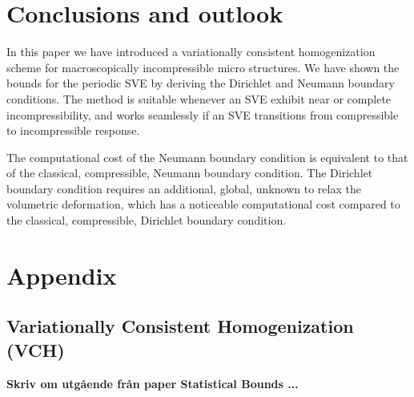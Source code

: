\documentclass[12pt,a4paper]{article}
\begin{document}


\section{Conclusions and outlook}
In this paper we have introduced a variationally consistent homogenization scheme for macroscopically incompressible micro structures.
We have shown the bounds for the periodic SVE by deriving the Dirichlet and Neumann boundary conditions.
The method is suitable whenever an SVE exhibit near or complete incompressibility, and works seamlessly if an SVE transitions from compressible to incompressible response.

The computational cost of the Neumann boundary condition is equivalent to that of the classical, compressible, Neumann boundary condition.
The Dirichlet boundary condition requires an additional, global, unknown to relax the volumetric deformation, which has a noticeable computational cost compared to the classical, compressible, Dirichlet boundary condition.




%
%
%

%

\appendix
\setcounter{equation}{0}
\renewcommand{\theequation}{A-\arabic{equation}}

\section{Appendix}

\subsection{Variationally Consistent Homogenization (VCH)}

\textbf{Skriv om utg\aa{}ende fr\aa{}n paper Statistical Bounds ...}
\end{document}
